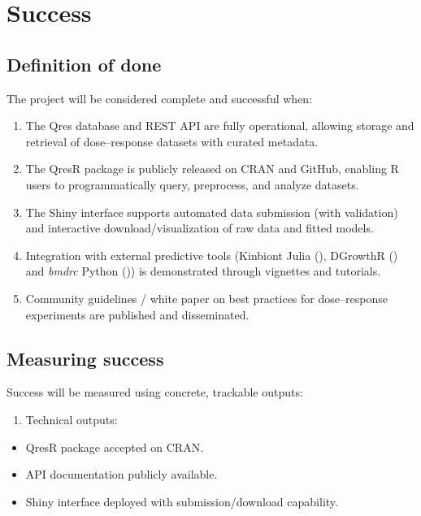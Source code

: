 \documentclass[
]{article}
\providecommand{\tightlist}{%
  \setlength{\itemsep}{0pt}\setlength{\parskip}{0pt}}
\begin{document}
\section{Success}\label{success}

\subsection{Definition of done}\label{definition-of-done}

The project will be considered complete and successful when:

\begin{enumerate}
\def\labelenumi{\arabic{enumi}.}
\item
  The Qres database and REST API are fully operational, allowing storage
  and retrieval of dose--response datasets with curated metadata.
\item
  The QresR package is publicly released on CRAN and GitHub, enabling R
  users to programmatically query, preprocess, and analyze datasets.
\item
  The Shiny interface supports automated data submission (with
  validation) and interactive download/visualization of raw data and
  fitted models.
\item
  Integration with external predictive tools (Kinbiont Julia
  (), DGrowthR
  () and
  \emph{bmdrc} Python ()) is
  demonstrated through vignettes and tutorials.
\item
  Community guidelines / white paper on best practices for
  dose--response experiments are published and disseminated.
\end{enumerate}

\subsection{Measuring success}\label{measuring-success}

Success will be measured using concrete, trackable outputs:

\begin{enumerate}
\def\labelenumi{\arabic{enumi}.}
\tightlist
\item
  Technical outputs:
\end{enumerate}

\begin{itemize}
\tightlist
\item
  QresR package accepted on CRAN.
\item
  API documentation publicly available.
\item
  Shiny interface deployed with submission/download capability.
\end{itemize}
\end{document}
